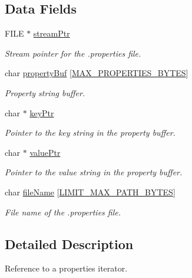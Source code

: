 \subsection*{Data Fields}
\begin{DoxyCompactItemize}
\item 
F\+I\+LE $\ast$ \hyperlink{struct_properties_iter__t_a024d5045e7a21e56ee3afb032f332484}{stream\+Ptr}
\begin{DoxyCompactList}\small\item\em Stream pointer for the .properties file. \end{DoxyCompactList}\item 
char \hyperlink{struct_properties_iter__t_acf14c3a5bb7a943b611c5c3cccc1369f}{property\+Buf} \mbox{[}\hyperlink{properties_8c_a1fd3d907b1f5724b0a82bda572946375}{M\+A\+X\+\_\+\+P\+R\+O\+P\+E\+R\+T\+I\+E\+S\+\_\+\+B\+Y\+T\+ES}\mbox{]}
\begin{DoxyCompactList}\small\item\em Property string buffer. \end{DoxyCompactList}\item 
char $\ast$ \hyperlink{struct_properties_iter__t_a7c6b1017f15b21d000ab9dd85befc433}{key\+Ptr}
\begin{DoxyCompactList}\small\item\em Pointer to the key string in the property buffer. \end{DoxyCompactList}\item 
char $\ast$ \hyperlink{struct_properties_iter__t_a65764e581669dca366097828bd810c4f}{value\+Ptr}
\begin{DoxyCompactList}\small\item\em Pointer to the value string in the property buffer. \end{DoxyCompactList}\item 
char \hyperlink{struct_properties_iter__t_a0511af8cd9557130b0376dff8395c4ba}{file\+Name} \mbox{[}\hyperlink{limit_8h_accd19a6264ef965c02f113dc01610e14}{L\+I\+M\+I\+T\+\_\+\+M\+A\+X\+\_\+\+P\+A\+T\+H\+\_\+\+B\+Y\+T\+ES}\mbox{]}
\begin{DoxyCompactList}\small\item\em File name of the .properties file. \end{DoxyCompactList}\end{DoxyCompactItemize}


\subsection{Detailed Description}
Reference to a properties iterator. 

